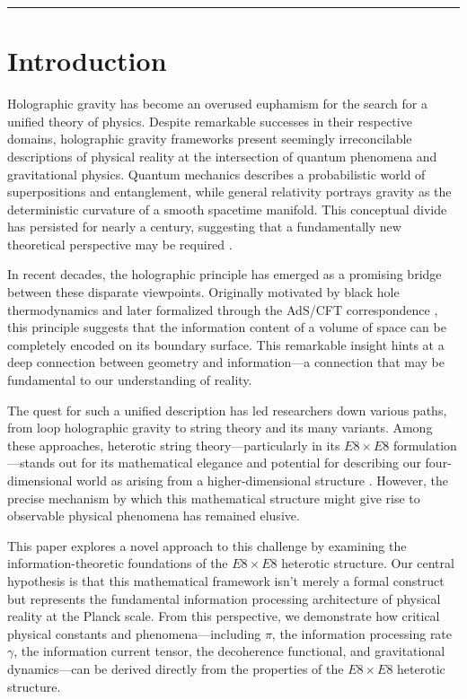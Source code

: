 \documentclass[11pt,english,twoside]{article}
\begin{document}
\vspace{0.2cm}
\par\noindent\rule{\textwidth}{0.5pt}

\section{Introduction}

Holographic gravity has become an overused euphamism for the search for a unified theory of physics. Despite remarkable successes in their respective domains, holographic gravity frameworks present seemingly irreconcilable descriptions of physical reality at the intersection of quantum phenomena and gravitational physics. Quantum mechanics describes a probabilistic world of superpositions and entanglement, while general relativity portrays gravity as the deterministic curvature of a smooth spacetime manifold. This conceptual divide has persisted for nearly a century, suggesting that a fundamentally new theoretical perspective may be required \cite{Weinberg1989}.

In recent decades, the holographic principle has emerged as a promising bridge between these disparate viewpoints. Originally motivated by black hole thermodynamics \cite{Bekenstein1973} and later formalized through the AdS/CFT correspondence \cite{Maldacena1998}, this principle suggests that the information content of a volume of space can be completely encoded on its boundary surface. This remarkable insight hints at a deep connection between geometry and information---a connection that may be fundamental to our understanding of reality.

The quest for such a unified description has led researchers down various paths, from loop holographic gravity to string theory and its many variants. Among these approaches, heterotic string theory---particularly in its $E8\times E8$ formulation---stands out for its mathematical elegance and potential for describing our four-dimensional world as arising from a higher-dimensional structure \cite{Gross1985a}. However, the precise mechanism by which this mathematical structure might give rise to observable physical phenomena has remained elusive.

This paper explores a novel approach to this challenge by examining the information-theoretic foundations of the $E8\times E8$ heterotic structure. Our central hypothesis is that this mathematical framework isn't merely a formal construct but represents the fundamental information processing architecture of physical reality at the Planck scale. From this perspective, we demonstrate how critical physical constants and phenomena---including $\pi$, the information processing rate $\gamma$, the information current tensor, the decoherence functional, and gravitational dynamics---can be derived directly from the properties of the $E8\times E8$ heterotic structure.
\end{document}
